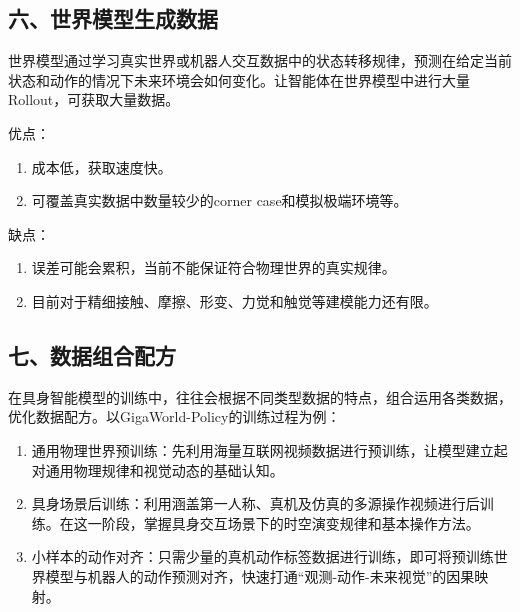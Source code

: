 \hypertarget{ux516dux4e16ux754cux6a21ux578bux751fux6210ux6570ux636e}{%
\subsection{六、世界模型生成数据}\label{ux516dux4e16ux754cux6a21ux578bux751fux6210ux6570ux636e}}

世界模型通过学习真实世界或机器人交互数据中的状态转移规律，预测在给定当前状态和动作的情况下未来环境会如何变化。让智能体在世界模型中进行大量Rollout，可获取大量数据。

优点：

\begin{enumerate}
\def\labelenumi{\arabic{enumi}.}
\item
  成本低，获取速度快。
\item
  可覆盖真实数据中数量较少的corner case和模拟极端环境等。
\end{enumerate}

缺点：

\begin{enumerate}
\def\labelenumi{\arabic{enumi}.}
\item
  误差可能会累积，当前不能保证符合物理世界的真实规律。
\item
  目前对于精细接触、摩擦、形变、力觉和触觉等建模能力还有限。
\end{enumerate}

\hypertarget{ux4e03ux6570ux636eux7ec4ux5408ux914dux65b9}{%
\subsection{七、数据组合配方}\label{ux4e03ux6570ux636eux7ec4ux5408ux914dux65b9}}

在具身智能模型的训练中，往往会根据不同类型数据的特点，组合运用各类数据，优化数据配方。以GigaWorld-Policy的训练过程为例：

\begin{enumerate}
\def\labelenumi{\arabic{enumi}.}
\item
  通用物理世界预训练：先利用海量互联网视频数据进行预训练，让模型建立起对通用物理规律和视觉动态的基础认知。
\item
  具身场景后训练：利用涵盖第一人称、真机及仿真的多源操作视频进行后训练。在这一阶段，掌握具身交互场景下的时空演变规律和基本操作方法。
\item
  小样本的动作对齐：只需少量的真机动作标签数据进行训练，即可将预训练世界模型与机器人的动作预测对齐，快速打通``观测-动作-未来视觉''的因果映射。
\end{enumerate}

